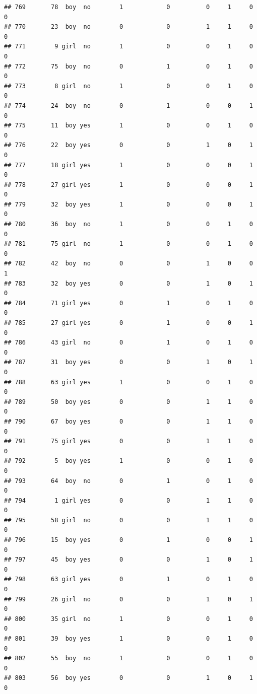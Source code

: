 \documentclass[man]{apa6}
\begin{document}
\begin{verbatim}
## 769       78  boy  no        1            0          0     1     0     0
## 770       23  boy  no        0            0          1     1     0     0
## 771        9 girl  no        1            0          0     1     0     0
## 772       75  boy  no        0            1          0     1     0     0
## 773        8 girl  no        1            0          0     1     0     0
## 774       24  boy  no        0            1          0     0     1     0
## 775       11  boy yes        1            0          0     1     0     0
## 776       22  boy yes        0            0          1     0     1     0
## 777       18 girl yes        1            0          0     0     1     0
## 778       27 girl yes        1            0          0     0     1     0
## 779       32  boy yes        1            0          0     0     1     0
## 780       36  boy  no        1            0          0     1     0     0
## 781       75 girl  no        1            0          0     1     0     0
## 782       42  boy  no        0            0          1     0     0     1
## 783       32  boy yes        0            0          1     0     1     0
## 784       71 girl yes        0            1          0     1     0     0
## 785       27 girl yes        0            1          0     0     1     0
## 786       43 girl  no        0            1          0     1     0     0
## 787       31  boy yes        0            0          1     0     1     0
## 788       63 girl yes        1            0          0     1     0     0
## 789       50  boy yes        0            0          1     1     0     0
## 790       67  boy yes        0            0          1     1     0     0
## 791       75 girl yes        0            0          1     1     0     0
## 792        5  boy yes        1            0          0     1     0     0
## 793       64  boy  no        0            1          0     1     0     0
## 794        1 girl yes        0            0          1     1     0     0
## 795       58 girl  no        0            0          1     1     0     0
## 796       15  boy yes        0            1          0     0     1     0
## 797       45  boy yes        0            0          1     0     1     0
## 798       63 girl yes        0            1          0     1     0     0
## 799       26 girl  no        0            0          1     0     1     0
## 800       35 girl  no        1            0          0     1     0     0
## 801       39  boy yes        1            0          0     1     0     0
## 802       55  boy  no        1            0          0     1     0     0
## 803       56  boy yes        0            0          1     0     1     0

\end{verbatim}
\end{document}
